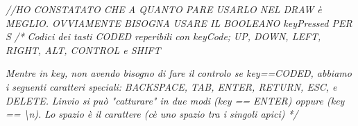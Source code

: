 \documentclass[
]{article}
\newenvironment{Shaded}{}{}
\newcommand{\CommentTok}[1]{\textcolor[rgb]{0.38,0.63,0.69}{\textit{#1}}}
\begin{document}
\begin{Shaded}
\begin{Highlighting}[]
\CommentTok{//HO CONSTATATO CHE A QUANTO PARE USARLO NEL DRAW è MEGLIO. OVVIAMENTE BISOGNA USARE IL BOOLEANO \textquotesingle{}keyPressed\textquotesingle{} PER S}
\CommentTok{/*}
\CommentTok{Codici dei tasti CODED reperibili con keyCode;}
\CommentTok{UP, DOWN, LEFT, RIGHT, ALT, CONTROL e SHIFT}

\CommentTok{Mentre in key, non avendo bisogno di fare il controlo se key==CODED, abbiamo i seguenti caratteri speciali:}
\CommentTok{BACKSPACE, TAB, ENTER, RETURN, ESC, e DELETE.}
\CommentTok{L\textquotesingle{}invio si può "catturare" in due modi (key == ENTER) oppure (key == \textquotesingle{}\textbackslash{}n\textquotesingle{}).}
\CommentTok{Lo spazio è il carattere \textquotesingle{} \textquotesingle{} (c\textquotesingle{}è uno spazio tra i singoli apici)}
\CommentTok{*/}
\end{Highlighting}
\end{Shaded}
\end{document}

